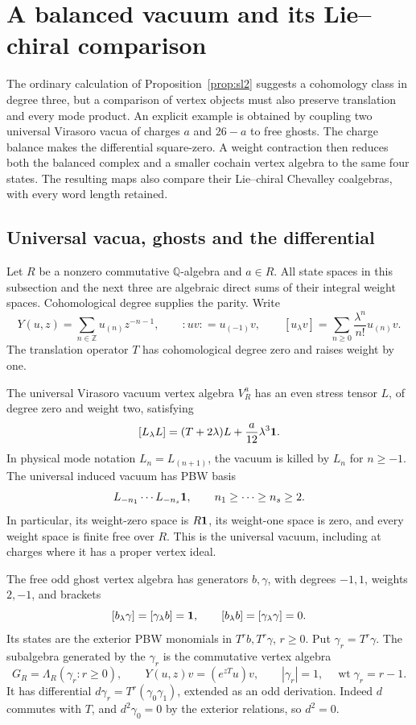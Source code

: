 \section{A balanced vacuum and its Lie--chiral comparison}
\label{bv:sec}

The ordinary calculation of Proposition~\ref{prop:sl2} suggests a
cohomology class in degree three, but a comparison of vertex objects
must also preserve translation and every mode product.  An explicit
example is obtained by coupling two universal Virasoro vacua of charges
\(a\) and \(26-a\) to free ghosts.  The charge balance makes the
differential square-zero.  A weight contraction then reduces both the
balanced complex and a smaller cochain vertex algebra to the same four
states.  The resulting maps also compare their Lie--chiral Chevalley
coalgebras, with every word length retained.

\subsection{Universal vacua, ghosts and the differential}

Let \(R\) be a nonzero commutative \(\mathbb Q\)-algebra and
\(a\in R\).  All state spaces in this subsection and the next three
are algebraic direct sums of their integral weight spaces.  Cohomological
degree supplies the parity.  Write
\[
 Y(u,z)=\sum_{n\in\mathbb Z}u_{(n)}z^{-n-1},\qquad
 {:}uv{:}=u_{(-1)}v,\qquad
 [u_\lambda v]=\sum_{n\geq0}\frac{\lambda^n}{n!}u_{(n)}v.
\]
The translation operator \(T\) has cohomological degree zero and
raises weight by one.

The universal Virasoro vacuum vertex algebra \(V_R^a\) has an even
stress tensor \(L\), of degree zero and weight two, satisfying
\[
 [L_\lambda L]=(T+2\lambda)L+\frac a{12}\lambda^3\mathbf{1}.
\]
In physical mode notation \(L_n=L_{(n+1)}\), the vacuum is killed by
\(L_n\) for \(n\geq-1\).  The universal induced vacuum has PBW basis
\[
 L_{-n_1}\cdots L_{-n_s}\mathbf{1},
 \qquad n_1\geq\cdots\geq n_s\geq2.
\]
In particular, its weight-zero space is \(R\mathbf{1}\), its weight-one
space is zero, and every weight space is finite free over \(R\).
This is the universal vacuum, including at charges where it has a
proper vertex ideal.

The free odd ghost vertex algebra has generators \(b,\gamma\), with
degrees \(-1,1\), weights \(2,-1\), and brackets
\[
 [b_\lambda\gamma]=[\gamma_\lambda b]=\mathbf{1},
 \qquad [b_\lambda b]=[\gamma_\lambda\gamma]=0.
\]
Its states are the exterior PBW monomials in \(T^rb,T^r\gamma\),
\(r\geq0\).  Put \(\gamma_r=T^r\gamma\).  The subalgebra generated
by the \(\gamma_r\) is the commutative vertex algebra
\[
 G_R=\Lambda_R(\gamma_r:r\geq0),\qquad
 Y(u,z)v=(e^{zT}u)v,
 \qquad |\gamma_r|=1,\quad \operatorname{wt}\gamma_r=r-1.
\]
It has differential \(d\gamma_r=T^r(\gamma_0\gamma_1)\), extended as
an odd derivation.  Indeed \(d\) commutes with \(T\), and
\(d^2\gamma_0=0\) by the exterior relations, so \(d^2=0\).

